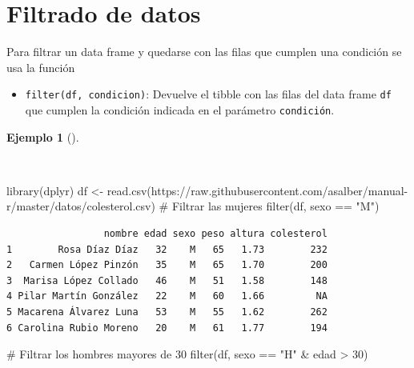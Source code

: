 \documentclass[
  a4paper,
]{scrreport}
\newenvironment{Shaded}{\begin{snugshade}}{\end{snugshade}}
\newcommand{\CommentTok}[1]{\textcolor[rgb]{0.37,0.37,0.37}{#1}}
\newcommand{\DecValTok}[1]{\textcolor[rgb]{0.68,0.00,0.00}{#1}}
\newcommand{\FunctionTok}[1]{\textcolor[rgb]{0.28,0.35,0.67}{#1}}
\newcommand{\NormalTok}[1]{\textcolor[rgb]{0.00,0.23,0.31}{#1}}
\newcommand{\OtherTok}[1]{\textcolor[rgb]{0.00,0.23,0.31}{#1}}
\newcommand{\SpecialCharTok}[1]{\textcolor[rgb]{0.37,0.37,0.37}{#1}}
\newcommand{\StringTok}[1]{\textcolor[rgb]{0.13,0.47,0.30}{#1}}
\providecommand{\tightlist}{%
  \setlength{\itemsep}{0pt}\setlength{\parskip}{0pt}}\usepackage{longtable,booktabs,array}
\theoremstyle{definition}
\theoremstyle{definition}
\newtheorem{example}{Ejemplo}[chapter]
\theoremstyle{remark}
\begin{document}
\section{Filtrado de datos}\label{filtrado-de-datos}

Para filtrar un data frame y quedarse con las filas que cumplen una
condición se usa la función

\begin{itemize}
\tightlist
\item
  \texttt{filter(df,\ condicion)}: Devuelve el tibble con las filas del
  data frame \texttt{df} que cumplen la condición indicada en el
  parámetro \texttt{condición}.
\end{itemize}

\begin{example}[]\protect\hypertarget{exm-filter}{}\label{exm-filter}

~

\begin{Shaded}
\begin{Highlighting}[]
\FunctionTok{library}\NormalTok{(dplyr)}
\NormalTok{df }\OtherTok{\textless{}{-}} \FunctionTok{read.csv}\NormalTok{(}\StringTok{\textquotesingle{}https://raw.githubusercontent.com/asalber/manual{-}r/master/datos/colesterol.csv\textquotesingle{}}\NormalTok{)}
\CommentTok{\# Filtrar las mujeres}
\FunctionTok{filter}\NormalTok{(df, sexo }\SpecialCharTok{==} \StringTok{"M"}\NormalTok{)}
\end{Highlighting}
\end{Shaded}

\begin{verbatim}
                 nombre edad sexo peso altura colesterol
1        Rosa Díaz Díaz   32    M   65   1.73        232
2   Carmen López Pinzón   35    M   65   1.70        200
3  Marisa López Collado   46    M   51   1.58        148
4 Pilar Martín González   22    M   60   1.66         NA
5 Macarena Álvarez Luna   53    M   55   1.62        262
6 Carolina Rubio Moreno   20    M   61   1.77        194
\end{verbatim}

\begin{Shaded}
\begin{Highlighting}[]
\CommentTok{\# Filtrar los hombres mayores de 30 }
\FunctionTok{filter}\NormalTok{(df, sexo }\SpecialCharTok{==} \StringTok{"H"} \SpecialCharTok{\&}\NormalTok{ edad }\SpecialCharTok{\textgreater{}} \DecValTok{30}\NormalTok{)}
\end{Highlighting}
\end{Shaded}


\end{example}
\end{document}
